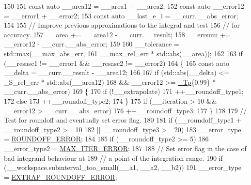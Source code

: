 \begin{DoxyCode}
150 
151           \textcolor{keyword}{const} \textcolor{keyword}{auto} \_\_area12 = \_\_area1 + \_\_area2;
152           \textcolor{keyword}{const} \textcolor{keyword}{auto} \_\_error12 = \_\_error1 + \_\_error2;
153           \textcolor{keyword}{const} \textcolor{keyword}{auto} \_\_last\_e\_i = \_\_curr.\_\_abs\_error;
154 
155           \textcolor{comment}{// Improve previous approximations to the integral and test}
156           \textcolor{comment}{// for accuracy.}
157           \_\_area += \_\_area12 - \_\_curr.\_\_result;
158           \_\_errsum += \_\_error12 - \_\_curr.\_\_abs\_error;
159 
160           \_\_tolerance = std::max(\_\_max\_abs\_err,
161                                  \_\_max\_rel\_err * std::abs(\_\_area));
162 
163           \textcolor{keywordflow}{if} (\_\_resasc1 != \_\_error1 && \_\_resasc2 != \_\_error2)
164             \{
165               \textcolor{keyword}{const} \textcolor{keyword}{auto} \_\_delta = \_\_curr.\_\_result - \_\_area12;
166 
167               \textcolor{keywordflow}{if} (std::abs(\_\_delta) <= \_S\_rel\_err * std::abs(\_\_area12)
168                          && \_\_error12 >= \hyperlink{namespace____gnu__cxx_a3b19a9c800ca194374ef9172290f7d79}{\_Tp}\{0.99\} * \_\_curr.\_\_abs\_error)
169                 \{
170                   \textcolor{keywordflow}{if} (!\_\_extrapolate)
171                     ++\_\_roundoff\_type1;
172                   \textcolor{keywordflow}{else}
173                     ++\_\_roundoff\_type2;
174                 \}
175               \textcolor{keywordflow}{if} (\_\_iteration > 10 && \_\_error12 > \_\_curr.\_\_abs\_error)
176                 ++\_\_roundoff\_type3;
177             \}
178 
179           \textcolor{comment}{// Test for roundoff and eventually set error flag.}
180 
181           \textcolor{keywordflow}{if} (\_\_roundoff\_type1 + \_\_roundoff\_type2 >= 10
182            || \_\_roundoff\_type3 >= 20)
183             \_\_error\_type = \hyperlink{namespace____gnu__cxx_ad6c62dd86a596716cece6ac2d4cfd4b3a29574de87143c7715e9a138d7340e8ae}{ROUNDOFF\_ERROR};
184 
185           \textcolor{keywordflow}{if} (\_\_roundoff\_type2 >= 5)
186             \_\_error\_type2 = \hyperlink{namespace____gnu__cxx_ad6c62dd86a596716cece6ac2d4cfd4b3a420d46d10205dd953d0ccce5323afc4c}{MAX\_ITER\_ERROR};
187 
188           \textcolor{comment}{// Set error flag in the case of bad integrand behaviour at}
189           \textcolor{comment}{// a point of the integration range.}
190           \textcolor{keywordflow}{if} (\_\_workspace.subinterval\_too\_small(\_\_a1, \_\_a2, \_\_b2))
191             \_\_error\_type = \hyperlink{namespace____gnu__cxx_ad6c62dd86a596716cece6ac2d4cfd4b3ac3b74f0b40291f29a3cb3a188412308b}{EXTRAP\_ROUNDOFF\_ERROR};

\end{DoxyCode}
